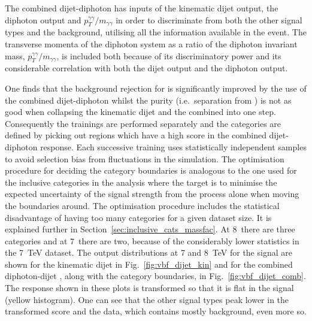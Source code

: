 The combined dijet-diphoton \BDT has inputs of the kinematic dijet \BDT output, the diphoton \BDT output and $p_{T}^{\gamma\gamma}/m_{\gamma\gamma}$ in order to discriminate \VBF from both the other signal types and the background, utilising all the information available in the event. The transverse momenta of the diphoton system as a ratio of the diphoton invariant mass, $p_{T}^{\gamma\gamma}/m_{\gamma\gamma}$, is included both because of its discriminatory power and its considerable correlation with both the dijet \BDT output and the diphoton \BDT output.

One finds that the background rejection for \VBF is significantly improved by the use of the combined dijet-diphoton \BDT whilst the \VBF purity (i.e.~separation from \ggH) is not as good when collapsing the kinematic dijet \BDT and the combined \BDT into one step. Consequently the trainings are performed separately and the \VBF categories are defined by picking out regions which have a high score in the combined dijet-diphoton \BDT response. Each successive \BDT training uses statistically independent \MC samples to avoid selection bias from fluctuations in the simulation. The optimisation procedure for deciding the category boundaries is analogous to the one used for the inclusive categories in the \MFM analysis where the target is to minimise the expected uncertainty of the signal strength from the \VBF process alone when moving the boundaries around. The optimisation procedure includes the statistical disadvantage of having too many categories for a given dataset size. It is explained further in Section~\ref{sec:inclusive_cats_massfac}. At 8~\TeV there are three \VBF categories and at 7~\TeV there are two, because of the considerably lower statistics in the 7~TeV dataset. The output distributions at 7 and 8~TeV for the signal are shown for the kinematic dijet \BDT in Fig.~\ref{fig:vbf_dijet_kin} and for the combined diphoton-dijet \BDT, along with the \VBF category boundaries, in Fig.~\ref{fig:vbf_dijet_comb}. The \BDT response shown in these plots is transformed so that it is flat in the \VBF signal (yellow histogram). One can see that the other signal types peak lower in the transformed score and the data, which contains mostly background, even more so. 

